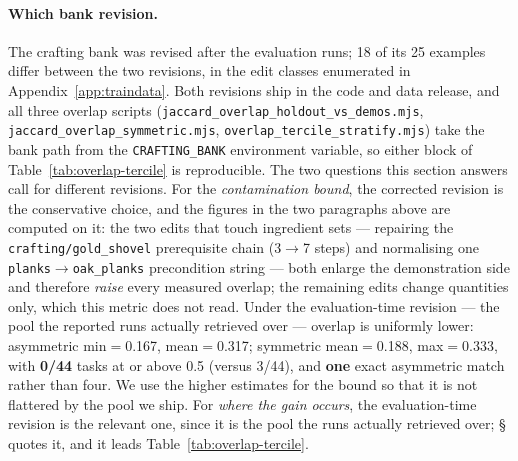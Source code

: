 \documentclass[letterpaper]{article} %
\newcommand{\appref}[1]{Appendix~\ref{#1}}
\newcommand{\bodyref}[1]{\getrefnumber{#1}}
\begin{document}
\paragraph{Which bank revision.}  The crafting bank was revised after the
evaluation runs; 18 of its 25 examples differ between the two revisions, in
the edit classes enumerated in \appref{app:traindata}.  Both revisions ship in
the code and data release, and all three overlap scripts
(\texttt{jaccard\_overlap\_holdout\_vs\_demos.mjs},
\texttt{jaccard\_overlap\_symmetric.mjs},
\texttt{overlap\_tercile\_stratify.mjs}) take the bank path from the
\texttt{CRAFTING\_BANK} environment variable, so either block of
Table~\ref{tab:overlap-tercile} is reproducible.  The two questions this
section answers call for different revisions.  For the \emph{contamination
bound}, the corrected revision is the conservative choice, and the figures in
the two paragraphs above are computed on it: the two edits that touch ingredient sets ---
repairing the \texttt{crafting/gold\_shovel} prerequisite chain (3$\to$7
steps) and normalising one \texttt{planks}$\to$\texttt{oak\_planks}
precondition string --- both enlarge the demonstration side and therefore
\emph{raise} every measured overlap; the remaining edits change quantities
only, which this metric does not read.  Under the
evaluation-time revision --- the pool the reported runs actually
retrieved over --- overlap is uniformly lower: asymmetric min$=$0.167,
mean$=$0.317; symmetric mean$=$0.188, max$=$0.333, with
\textbf{0/44} tasks at or above 0.5 (versus 3/44), and \textbf{one}
exact asymmetric match rather than four.  We use the higher estimates for the
bound so that it is not flattered by the pool we ship.  For \emph{where the gain
occurs}, the evaluation-time revision is the relevant one, since it is the pool
the runs actually retrieved over; \S\bodyref{sec:tasks} quotes it, and it leads
Table~\ref{tab:overlap-tercile}.
\end{document}
